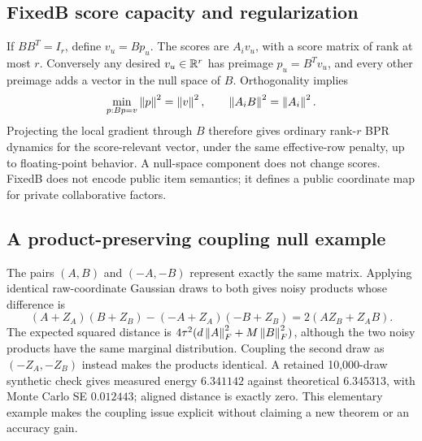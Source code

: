 \subsection{FixedB score capacity and regularization}
If $BB^T=I_r$, define $v_u=Bp_u$. The scores are $A_iv_u$, with a score
matrix of rank at most $r$. Conversely any desired $v_u\in\mathbb{R}^r$ has
preimage $p_u=B^Tv_u$, and every other preimage adds a vector in the null
space of $B$. Orthogonality implies
\begin{equation}
 \min_{p:Bp=v}\left\lVert p\right\rVert^2=\left\lVert v\right\rVert^2,
 \qquad \left\lVert A_iB\right\rVert^2=\left\lVert A_i\right\rVert^2.
\end{equation}
Projecting the local gradient through $B$ therefore gives ordinary rank-$r$
BPR dynamics for the score-relevant vector, under the same effective-row
penalty, up to floating-point behavior. A null-space component does not
change scores. FixedB does not encode public item semantics; it defines
a public coordinate map for private collaborative factors.

\subsection{A product-preserving coupling null example}
The pairs $(A,B)$ and $(-A,-B)$ represent exactly the same matrix. Applying
identical raw-coordinate Gaussian draws to both gives noisy products whose
difference is
\begin{equation}
 (A+Z_A)(B+Z_B)-(-A+Z_A)(-B+Z_B)
 =2(AZ_B+Z_AB).
\end{equation}
The expected squared distance is
$4\tau^2(d\left\lVert A\right\rVert_F^2+M\left\lVert B\right\rVert_F^2)$, although the two noisy products
have the same marginal distribution. Coupling the second draw as
$(-Z_A,-Z_B)$ instead makes the products identical. A retained 10,000-draw
synthetic check gives measured energy $6.341142$ against theoretical
$6.345313$, with Monte Carlo SE $0.012443$; aligned distance is exactly zero.
This elementary example makes the coupling issue explicit without claiming
a new theorem or an accuracy gain.

